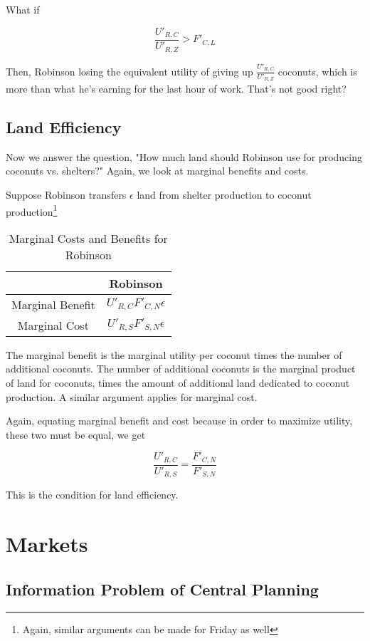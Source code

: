 \documentclass[11pt]{scrartcl}
\begin{document}
What if 

\[ \frac{U'_{R,C}}{U'_{R,Z}} > F'_{C,L} \]

Then, Robinson losing the equivalent utility of giving up $\frac{U'_{R,C}}{U'_{R,Z}}$ coconuts, which is more than what he's earning for the last hour of work. That's not good right?

\subsection{Land Efficiency}

Now we answer the question, "How much land should Robinson use for producing coconuts vs. shelters?" Again, we look at marginal benefits and costs.

Suppose Robinson transfers $\epsilon$ land from shelter production to coconut production\footnote{Again, similar arguments can be made for Friday as well}

\begin{table}[ht!]
\begin{longtable}{c|c}
\hline
 & Robinson \\
\hline
Marginal Benefit & $U'_{R,C} F'_{C,N} \epsilon$ \\
Marginal Cost & $U'_{R,S} F'_{S,N} \epsilon$ \\
\hline
\end{longtable}
\caption{Marginal Costs and Benefits for Robinson}
\end{table}

The marginal benefit is the marginal utility per coconut times the number of additional coconuts. The number of additional coconuts is the marginal product of land for coconuts, times the amount of additional land dedicated to coconut production. A similar argument applies for marginal cost.

Again, equating marginal benefit and cost because in order to maximize utility, these two must be equal, we get

\[ \frac{U'_{R,C}}{U'_{R,S}} = \frac{F'_{C,N}}{F'_{S,N}} \]

This is the condition for land efficiency.

\section{Markets}

\subsection{Information Problem of Central Planning}
\end{document}
